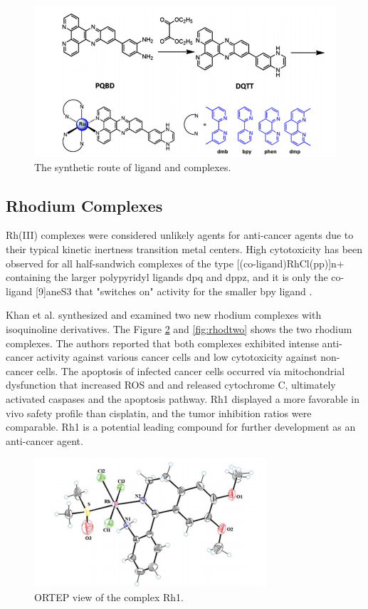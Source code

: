 \begin{figure}[!ht]
    \centering
    \includegraphics[scale = 0.55]{ruthone.png}
    \caption{The synthetic route of ligand and complexes.}
    \label{fig:ruthone}
\end{figure}

\subsection{Rhodium Complexes}

Rh(III) complexes were considered unlikely agents for anti-cancer agents due to their typical kinetic inertness transition metal centers. High cytotoxicity has been observed for all half-sandwich complexes of the type [(co-ligand)RhCl(pp)]n+ containing the larger polypyridyl ligands dpq and dppz, and it is only the co-ligand [9]aneS3 that "switches on" activity for the smaller bpy ligand \cite{geldmacher2012rhodium}.

Khan et al. synthesized and examined two new rhodium complexes with isoquinoline derivatives. The Figure \ref{fig:rhodone} and \ref{fig:rhodtwo} shows the two rhodium complexes. The authors reported that both complexes exhibited intense anti-cancer activity against various cancer cells and low cytotoxicity against non-cancer cells. The apoptosis of infected cancer cells occurred via mitochondrial dysfunction that increased ROS and  and released cytochrome C, ultimately activated caspases and the apoptosis pathway.  Rh1 displayed a more favorable in vivo safety profile than cisplatin, and the tumor inhibition ratios were comparable. Rh1 is a potential leading compound for further development as an anti-cancer agent. 

\begin{figure}[!ht]
    \centering
    \includegraphics[scale = 1.5]{rodone.png}
    \caption{ORTEP view of the complex Rh1.}
    \label{fig:rhodone}
\end{figure}

